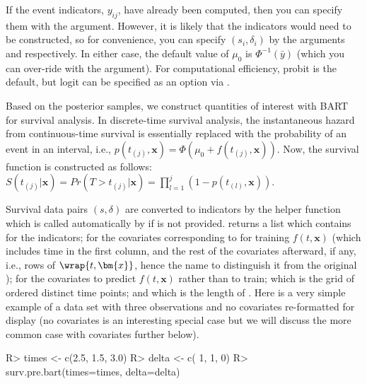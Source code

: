 \documentclass[article]{jss}
\begin{document}
If the event indicators, $y_{ij}$, have already been computed, then
you can specify them with the  argument.
However, it is likely that the
indicators would need to be constructed, so for convenience, you can
specify $(s_i, \delta_i)$ by the arguments  and
 respectively.  In either case, the default value of $\mu_0$
is $\Phi^{-1}(\bar{y})$
(which you can over-ride with the  argument).  %
For computational efficiency, probit \citep{AlbeChib93} is the
default, but logit \citep{HolmHeld06,GramPols12} can be specified as
an option via .

Based on the posterior samples, we construct quantities of interest
with BART for survival analysis.  In discrete-time survival analysis,
the instantaneous hazard from continuous-time survival is essentially
replaced with the probability of an event in an interval, i.e., 
$p(t_{(j)},\bm{x})=\Phi(\mu_0+f(t_{(j)},\bm{x}))$.  Now, the survival
function is constructed as follows:
$ S(t_{(j)}|\bm{x})=Pr(T>t_{(j)}|\bm{x})=\prod_{l=1}^j
(1-p(t_{(l)},\bm{x}))$.

Survival data pairs $(s, \delta)$ are converted to indicators by the
helper function  which is called automatically by
 if  is not provided.
 returns a list which contains  for
the indicators;  for the covariates corresponding to
 for training $f(t, \bm{x})$ (which includes time in the
first column, and the rest of the covariates afterward, if any, i.e.,
rows of $\wrap{t, \bm{x}}$, hence the name  to
distinguish it from the original );  for
the covariates to predict $f(t, \bm{x})$ rather than to train;
 which is the grid of ordered distinct time points;
and  which is the length of .
Here is a very simple example of a data set with
three observations and no covariates re-formatted for display 
(no covariates is an interesting special case but we
will discuss the more common case with covariates further below).
\begin{Sinput}
R> times <- c(2.5, 1.5, 3.0)
R> delta <- c(  1,   1,   0)
R> surv.pre.bart(times=times, delta=delta)
\end{Sinput}
\end{document}
